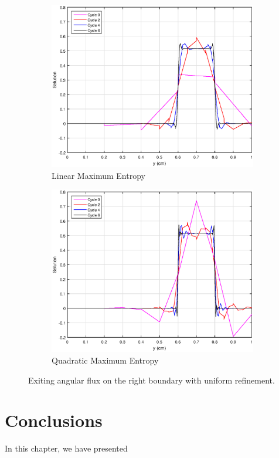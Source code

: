 \begin{figure}
{}
\vspace{2.5mm}
{
	\begin{subfigure}[b]{0.45\textwidth}
		\centering
		\label{subfig::SL_uniform_ef_me1}
		\includegraphics[width=\textwidth]{figures/sec_BF/SL_ME_k1_uniform.eps}
		\caption{Linear Maximum Entropy}
	\end{subfigure}
	\hfill
	\begin{subfigure}[b]{0.45\textwidth}
		\centering
		\label{subfig::SL_uniform_ef_me2}
		\includegraphics[width=\textwidth]{figures/sec_BF/SL_ME_k2_uniform.eps}
		\caption{Quadratic Maximum Entropy}
	\end{subfigure}
}
\caption{Exiting angular flux on the right boundary with uniform refinement.}
\label{fig::BF_Results_SL_uniform_exit_flux}
\end{figure}

\section{Conclusions}
\label{sec::BF_Conclusions}

In this chapter, we have presented 





